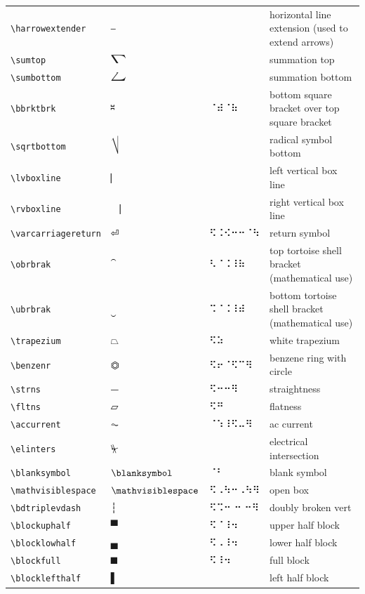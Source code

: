 \documentclass[oneside]{article}
\begin{document}
\begin{longtable}{llll}
\verb|\harrowextender| & $\harrowextender$ &    & {horizontal line extension (used to extend arrows)} \\[2ex]
\verb|\sumtop| & $\sumtop$ &    & {summation top} \\[2ex]
\verb|\sumbottom| & $\sumbottom$ &    & {summation bottom} \\[2ex]
\verb|\bbrktbrk| & $\bbrktbrk$ &  ⠈⠾⠈⠷  & {bottom square bracket over top square bracket} \\[2ex]
\verb|\sqrtbottom| & $\sqrtbottom$ &    & {radical symbol bottom} \\[2ex]
\verb|\lvboxline| & $\lvboxline$ &    & {left vertical box line} \\[2ex]
\verb|\rvboxline| & $\rvboxline$ &    & {right vertical box line} \\[2ex]
\verb|\varcarriagereturn| & $\varcarriagereturn$ &   ⠫⠨⠪⠒⠒⠈⠳   & {return symbol} \\[2ex]
\verb|\obrbrak| & $\obrbrak$ &   ⠣⠈⠨⠸⠷  & {top tortoise shell bracket (mathematical use)} \\[2ex]
\verb|\ubrbrak| & $\ubrbrak$ &   ⠩⠈⠨⠸⠾  & {bottom tortoise shell bracket (mathematical use)} \\[2ex]
\verb|\trapezium| & $\trapezium$ &  ⠫⠵  & {white trapezium} \\[2ex]
\verb|\benzenr| & $\benzenr$ &  ⠫⠖⠈⠫⠉⠻  & {benzene ring with circle} \\[2ex]
\verb|\strns| & $\strns$ &  ⠫⠒⠒⠻  & {straightness} \\[2ex]
\verb|\fltns| & $\fltns$ &  ⠫⠛  & {flatness} \\[2ex]
\verb|\accurrent| & $\accurrent$ &  ⠈⠱⠸⠫⠤⠻  & {ac current} \\[2ex]
\verb|\elinters| & $\elinters$ &    & {electrical intersection} \\[2ex]
\verb|\blanksymbol| & $\blanksymbol$ &  ⠈⠃  & {blank symbol} \\[2ex]
\verb|\mathvisiblespace| & $\mathvisiblespace$ &  ⠫⠠⠳⠒⠠⠳⠻  & {open box} \\[2ex]
\verb|\bdtriplevdash| & $\bdtriplevdash$ &  ⠫⠩⠒ ⠒ ⠒⠻  & {doubly broken vert} \\[2ex]
\verb|\blockuphalf| & $\blockuphalf$ &  ⠫⠈⠸⠲  & {upper half block} \\[2ex]
\verb|\blocklowhalf| & $\blocklowhalf$ &  ⠫⠠⠸⠲  & {lower half block} \\[2ex]
\verb|\blockfull| & $\blockfull$ &  ⠫⠸⠲  & {full block} \\[2ex]
\verb|\blocklefthalf| & $\blocklefthalf$ &    & {left half block} \\[2ex]

\end{longtable}
\end{document}

